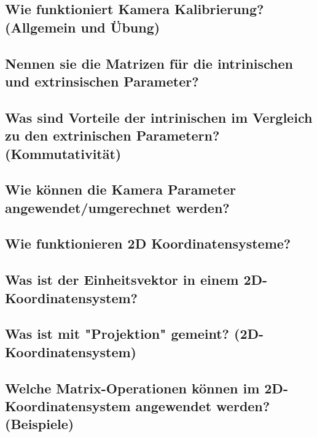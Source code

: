 \subsection{Wie funktioniert Kamera Kalibrierung? (Allgemein und Übung)}

\subsection{Nennen sie die Matrizen für die intrinischen und extrinsischen Parameter?}

\subsection{Was sind Vorteile der intrinischen im Vergleich zu den extrinischen Parametern? (Kommutativität)}

\subsection{Wie können die Kamera Parameter angewendet/umgerechnet werden?}

\subsection{Wie funktionieren 2D Koordinatensysteme?}

\subsection{Was ist der Einheitsvektor in einem 2D-Koordinatensystem?}

\subsection{Was ist mit "Projektion" gemeint? (2D-Koordinatensystem)}

\subsection{Welche Matrix-Operationen können im 2D-Koordinatensystem angewendet werden? (Beispiele)}


